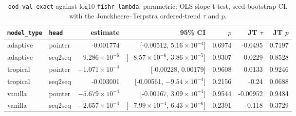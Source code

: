 \documentclass[10pt]{article}
\begin{document}
{\small
\begin{longtable}{llrrrrr}
\caption{\texttt{ood\_val\_exact} against log10 \texttt{fishr\_lambda}: parametric: OLS slope t-test, seed-bootstrap CI, with the Jonckheere--Terpstra ordered-trend $\tau$ and $p$.}\label{tab:trend-ood_val_exact}\\
\toprule
\texttt{model\_type} & \texttt{head} & estimate & 95\% CI & $p$ & JT $\tau$ & JT $p$\\
\midrule
\endhead
adaptive & pointer & -0.001774 & [-0.00512, $5.16\times10^{-4}$] & 0.6974 & -0.0495 & 0.7197\\
adaptive & seq2seq & $9.286\times10^{-6}$ & [$-8.57\times10^{-6}$, $3.86\times10^{-5}$] & 0.9307 & -0.0229 & 0.8528\\
tropical & pointer & $-1.071\times10^{-4}$ & [-0.00228, 0.00179] & 0.9608 & 0.0133 & 0.9246\\
tropical & seq2seq & -0.003001 & [-0.00561, $-9.54\times10^{-4}$] & 0.2156 & -0.24 & 0.0688\\
vanilla & pointer & $-5.679\times10^{-4}$ & [-0.00167, $3.09\times10^{-4}$] & 0.9544 & -0.00952 & 0.9484\\
vanilla & seq2seq & $-2.657\times10^{-4}$ & [$-7.99\times10^{-4}$, $6.43\times10^{-6}$] & 0.2391 & -0.118 & 0.3729\\
\bottomrule
\end{longtable}
}
\end{document}
